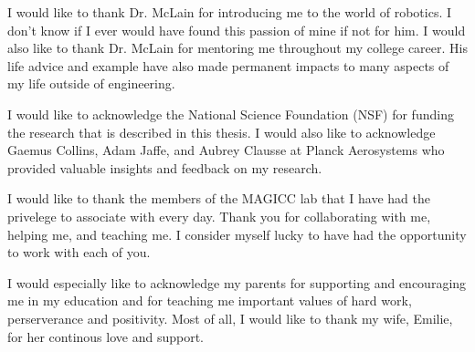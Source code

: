 \afterpage{\cleardoublepage}
%
I would like to thank Dr. McLain for introducing me to the world of robotics. I
don't know if I ever would have found this passion of mine if not for him. I would also
like to thank Dr. McLain for mentoring me throughout my college career. His life
advice and example have also made permanent impacts to many
aspects of my life outside of engineering.

I would like to acknowledge the National Science Foundation (NSF) for funding
the research that is described in this thesis. I would also like to acknowledge
Gaemus Collins, Adam Jaffe, and Aubrey Clausse at Planck Aerosystems who provided valuable insights and feedback
on my research.

I would like to thank the members of the MAGICC lab that I
have had the privelege to associate with every day. Thank you for collaborating
with me, helping me, and teaching me. I consider myself lucky to have had the
opportunity to work with each of you.

I would especially like to acknowledge my parents for supporting and
encouraging me in my education and for teaching me important values of hard
work, perserverance and positivity. Most of all, I would like to thank my wife, Emilie, for
her continous love and support.
